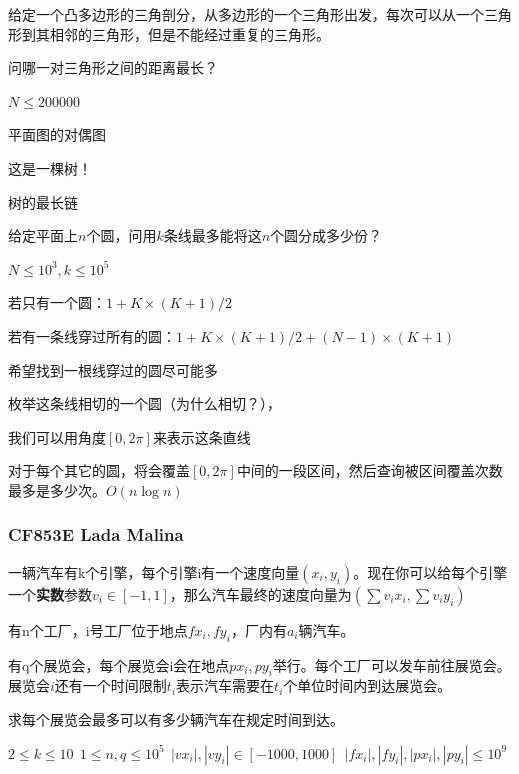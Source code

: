 \begin{frame}
    给定一个凸多边形的三角剖分，从多边形的一个三角形出发，每次可以从一个三角形到其相邻的三角形，但是不能经过重复的三角形。
    
    问哪一对三角形之间的距离最长？

    $N \le 200000$
\end{frame}

\begin{frame}
    平面图的对偶图
    
    这是一棵树！
    
    树的最长链

\end{frame}

\begin{frame}
    给定平面上$n$个圆，问用$k$条线最多能将这$n$个圆分成多少份？

    $N \le 10^3, k \le 10^5$

\end{frame}

\begin{frame}
    若只有一个圆：$1 + K \times (K+1)/2$
    
    若有一条线穿过所有的圆：$1+K \times (K+1)/2+(N-1) \times (K+1)$
    
    希望找到一根线穿过的圆尽可能多
\end{frame}

\begin{frame}
    枚举这条线相切的一个圆（为什么相切？），

    我们可以用角度$[0,2 \pi]$来表示这条直线

    对于每个其它的圆，将会覆盖$[0,2 \pi]$中间的一段区间，然后查询被区间覆盖次数最多是多少次。$O(n\log n)$

\end{frame}

\begin{frame}
\frametitle{CF853E Lada Malina}
\pause
一辆汽车有k个引擎，每个引擎i有一个速度向量$(x_i,y_i)$。现在你可以给每个引擎一个\textbf{实数}参数$v_i \in [-1,1]$，那么汽车最终的速度向量为$(\sum v_ix_i,\sum v_iy_i)$

有n个工厂，i号工厂位于地点$fx_i,fy_i$，厂内有$a_i$辆汽车。

有q个展览会，每个展览会i会在地点$px_i,py_i$举行。每个工厂可以发车前往展览会。展览会$i$还有一个时间限制$t_i$表示汽车需要在$t_i$个单位时间内到达展览会。

求每个展览会最多可以有多少辆汽车在规定时间到达。

$2 \le k \le 10 \ \ 1 \le n,q \le 10^5 \ \ |vx_i|,|vy_i| \in [-1000,1000] \ \ |fx_i|,|fy_i|,|px_i|,|py_i| \le 10^9$
\end{frame}


